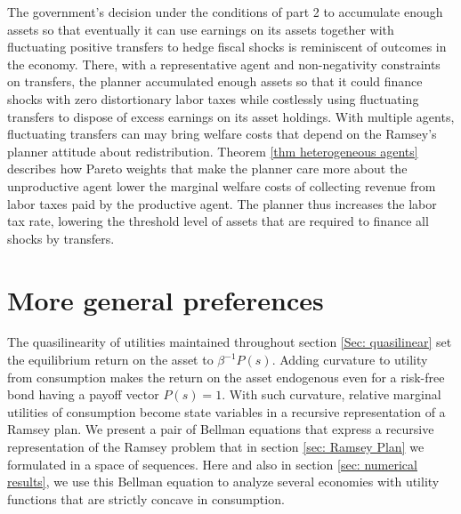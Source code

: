 \documentclass[thmsb,11pt]{article}
\begin{document}
The government's decision under the conditions of part 2  to accumulate enough  assets so that
 eventually it can use earnings on its assets together with fluctuating positive  transfers to hedge fiscal shocks is reminiscent of outcomes in the \cite{Aiyagari2002} economy. There, with a representative agent and non-negativity constraints on transfers, the planner
accumulated enough assets so that it could finance shocks with zero distortionary labor taxes while costlessly using fluctuating transfers
to dispose of excess earnings on its asset holdings. With multiple agents, fluctuating transfers can may bring welfare costs that  depend on
the Ramsey's planner attitude about  redistribution. Theorem \ref{thm heterogeneous agents} describes how Pareto weights that  make the planner care more about the unproductive agent lower the marginal welfare costs of collecting revenue from labor taxes paid by the productive agent. The planner thus increases the labor tax rate, lowering the threshold level of assets that are required to finance all shocks by transfers.
\color{black}

\section{More general preferences}
\label{Sec: more general economies}
The quasilinearity of utilities maintained throughout  section \ref{Sec: quasilinear} set  the equilibrium  return on the asset to $\beta^{-1}P(s)$.
Adding curvature to utility from consumption  makes the  return on the asset   endogenous even for a risk-free bond having a payoff vector $P(s)=1$.
With such curvature, relative marginal utilities of consumption become state variables in a recursive representation of a Ramsey plan.
We  present a pair of Bellman equations that express a recursive representation of the Ramsey problem that in section \ref{sec: Ramsey Plan}
 we formulated in a space of sequences. Here  and also in section  \ref{sec: numerical results}, we  use this Bellman equation to analyze
several economies  with utility functions that are strictly concave in consumption.  
 
 
%
\end{document}
